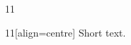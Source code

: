 \documentclass[paper=A4]{ropas-poster}
\begin{document}
\begin{postergrid}{1}{1}
\begin{posterblock}{1}{1}[align=centre]
Short text.
\end{posterblock}
\end{postergrid}
\end{document}
